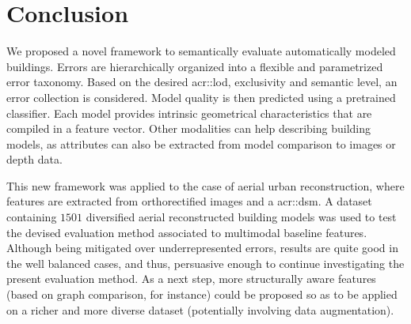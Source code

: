 \documentclass[runningheads]{llncs}
\begin{document}
\section{Conclusion}

We proposed a novel framework to semantically evaluate automatically modeled buildings. Errors are hierarchically organized into a flexible and parametrized error taxonomy. Based on the desired \acrshort{acr::lod}, exclusivity and semantic level, an error collection is considered. Model quality is then predicted using a pretrained classifier. Each model provides intrinsic geometrical characteristics that are compiled in a feature vector. Other modalities can help describing building models, as attributes can also be extracted from model comparison to images or depth data.

This new framework was applied to the case of aerial urban reconstruction, where features are extracted from orthorectified images and a \acrshort{acr::dsm}. A dataset containing $1501$ diversified aerial reconstructed building models was used to test the devised evaluation method associated to multimodal baseline features. Although being mitigated over underrepresented errors, results are quite good in the well balanced cases, and thus, persuasive enough to continue investigating the present evaluation method. As a next step, more structurally aware features (based on graph comparison, for instance) could be proposed so as to be applied on a richer and more diverse dataset (potentially involving data augmentation).


\end{document}

